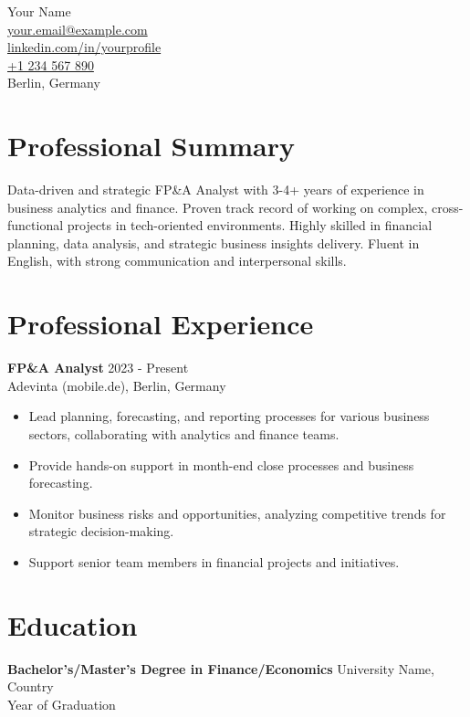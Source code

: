 \documentclass[a4paper,10pt]{article}
\begin{document}
\begin{center}
    {\LARGE Your Name} \\
    \vspace{5pt}
    \small
    \href{mailto:your.email@example.com}{your.email@example.com} \\
    \href{https://www.linkedin.com/in/yourprofile}{linkedin.com/in/yourprofile} \\
    \href{tel:+1234567890}{+1 234 567 890} \\
    Berlin, Germany \\
\end{center}

\section*{Professional Summary}
Data-driven and strategic FP\&A Analyst with 3-4+ years of experience in business analytics and finance. Proven track record of working on complex, cross-functional projects in tech-oriented environments. Highly skilled in financial planning, data analysis, and strategic business insights delivery. Fluent in English, with strong communication and interpersonal skills.

\section*{Professional Experience}

\textbf{FP\&A Analyst} \hfill 2023 - Present \\
Adevinta (mobile.de), Berlin, Germany
\begin{itemize}[leftmargin=0.5cm]
    \item Lead planning, forecasting, and reporting processes for various business sectors, collaborating with analytics and finance teams.
    \item Provide hands-on support in month-end close processes and business forecasting.
    \item Monitor business risks and opportunities, analyzing competitive trends for strategic decision-making.
    \item Support senior team members in financial projects and initiatives.
\end{itemize}

\section*{Education}

\textbf{Bachelor’s/Master’s Degree in Finance/Economics} \hfill University Name, Country \\
Year of Graduation
\end{document}
